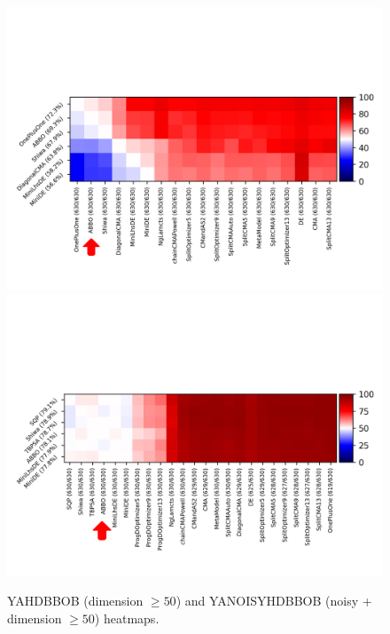 \begin{figure}[t]
\centering
\vspace{-0.2cm}
\includegraphics[trim={0 10 0 100},clip,width=.48\linewidth]{sections/appendix/h220benchmarks/benchmark/fa_yahdbbob.png}
    \includegraphics[trim={0 0 0 100},clip,width=.48\linewidth]{sections/appendix/h220benchmarks/benchmark/fa_yahdnoisybbob.png}
	\caption{YAHDBBOB (dimension $\geq 50$) and YANOISYHDBBOB (noisy + dimension $ \geq 50$)  heatmaps.}
    \label{bbobfigbis}
\end{figure}
